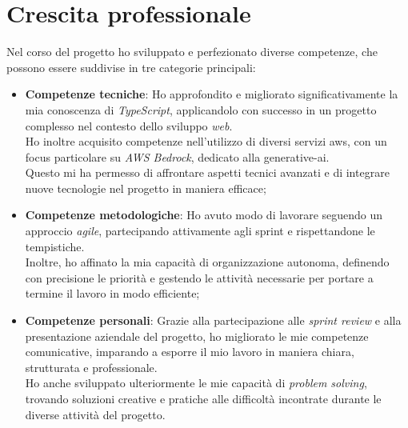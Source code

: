 \section{Crescita professionale}
\label{sez:crescita-professionale}

Nel corso del progetto ho sviluppato e perfezionato diverse competenze, che possono essere suddivise in tre categorie principali:

\begin{itemize}
\item \textbf{Competenze tecniche}:
Ho approfondito e migliorato significativamente la mia conoscenza di \textit{TypeScript}, applicandolo con successo in un progetto complesso nel contesto dello sviluppo \textit{web}. \\
Ho inoltre acquisito competenze nell'utilizzo di diversi servizi \gls{aws}, con un focus particolare su \textit{AWS Bedrock}, dedicato alla \gls{generative-ai}.\\
Questo mi ha permesso di affrontare aspetti tecnici avanzati e di integrare nuove tecnologie nel progetto in maniera efficace;
\item \textbf{Competenze metodologiche}:  
Ho avuto modo di lavorare seguendo un approccio \textit{agile}, partecipando attivamente agli \gls{sprint} e rispettandone le tempistiche. \\  
Inoltre, ho affinato la mia capacità di organizzazione autonoma, definendo con precisione le priorità e gestendo le attività necessarie per portare a termine il lavoro in modo efficiente;

\item \textbf{Competenze personali}:  
Grazie alla partecipazione alle \textit{sprint review} e alla presentazione aziendale del progetto, ho migliorato le mie competenze comunicative, imparando a esporre il mio lavoro in maniera chiara, strutturata e professionale. \\  
Ho anche sviluppato ulteriormente le mie capacità di \textit{problem solving}, trovando soluzioni creative e pratiche alle difficoltà incontrate durante le diverse attività del progetto.  
\end{itemize}